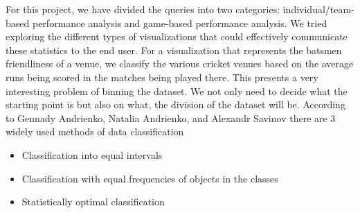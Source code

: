\documentclass[10pt,journal,compsoc]{IEEEtran}
\begin{document}
\begin{figure}[H]
\begin{center}
\end{center}
\end{figure}

For this project, we have divided the queries into two categories: individual/team-based performance analysis and game-based performance analysis. We tried exploring the different types of visualizations that could effectively communicate these statistics to the end user.
\linebreak
\linebreak
For a visualization that represents the batsmen friendliness of a venue, we classify the various cricket venues based on the average runs being scored in the matches being played there. This presents a very interesting problem of binning the dataset. We not only need to decide what the starting point is but also on what, the division of the dataset will be. According to Gennady Andrienko, Natalia Andrienko, and Alexandr Savinov\cite{relatedwork3} there are 3 widely used methods of data classification
\begin{itemize}
\item Classification into equal intervals
\item Classification with equal frequencies of objects in the classes
\item Statistically optimal classification
\end{itemize}

\begin{figure}[H]
\begin{center}
\end{center}
\end{figure}
\end{document}
